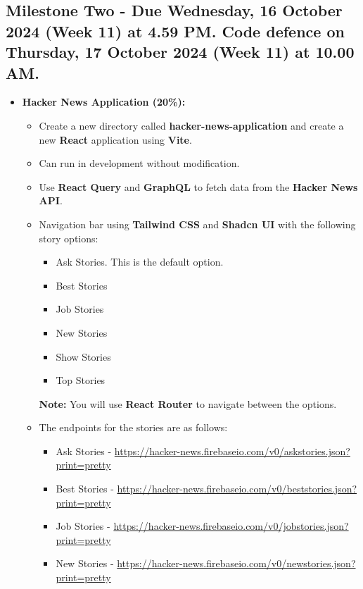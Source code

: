 \documentclass{article}
\begin{document}
	\subsection*{Milestone Two - Due Wednesday, 16 October 2024 (Week 11) at 4.59 PM. Code defence on Thursday, 17 October 2024 (Week 11) at 10.00 AM.}
	\begin{itemize}
	\item \textbf{Hacker News Application (20\%):}
	\begin{itemize}
		\item Create a new directory called \textbf{hacker-news-application} and create a new \textbf{React} application using \textbf{Vite}.
		\item Can run in development without modification.
		\item Use \textbf{React Query} and \textbf{GraphQL} to fetch data from the \textbf{Hacker News API}.
		\item Navigation bar using \textbf{Tailwind CSS} and \textbf{Shadcn UI} with the following story options:
		\begin{itemize}
			\item Ask Stories. This is the default option.
			\item Best Stories
			\item Job Stories
			\item New Stories
			\item Show Stories
			\item Top Stories
		\end{itemize}
		\textbf{Note:} You will use \textbf{React Router} to navigate between the options.
	\item The endpoints for the stories are as follows:
	\begin{itemize}
		\item Ask Stories - \href{https://hacker-news.firebaseio.com/v0/askstories.json?print=pretty}{https://hacker-news.firebaseio.com/v0/askstories.json?print=pretty}
		\item Best Stories - \href{https://hacker-news.firebaseio.com/v0/beststories.json?print=pretty}{https://hacker-news.firebaseio.com/v0/beststories.json?print=pretty}
		\item Job Stories - \href{https://hacker-news.firebaseio.com/v0/jobstories.json?print=pretty}{https://hacker-news.firebaseio.com/v0/jobstories.json?print=pretty}
		\item New Stories - \href{https://hacker-news.firebaseio.com/v0/newstories.json?print=pretty}{https://hacker-news.firebaseio.com/v0/newstories.json?print=pretty}

\end{itemize}
\end{itemize}
\end{itemize}
\end{document}
